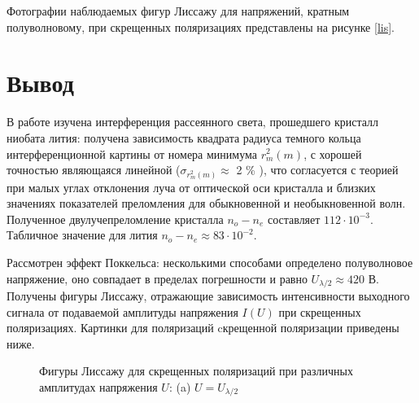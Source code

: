 	Фотографии наблюдаемых фигур Лиссажу для напряжений, кратным полуволновому, при скрещенных поляризациях представлены на рисунке \ref{lis}.
	
	\section{Вывод}
	
	В работе изучена интерференция рассеянного света, прошедшего кристалл ниобата лития: получена зависимость квадрата радиуса темного кольца интерференционной картины от номера минимума $r_m^2(m)$, с хорошей точностью являющаяся линейной ($\sigma_{r_m^2(m)} \approx $ 2 \% ), что согласуется с теорией при малых углах отклонения луча от оптической оси кристалла и близких значениях показателей преломления для обыкновенной и необыкновенной волн. Полученное двулучепреломление кристалла $n_o - n_e$ составляет $112 \cdot 10^{-3} $. Табличное значение для лития $n_o - n_e \approx 83 \cdot 10^{-2}$. 
	
	Рассмотрен эффект Поккельса: несколькими способами определено полуволновое напряжение, оно совпадает в пределах погрешности и равно $U_{\lambda/2} \approx 420$ В. Получены фигуры Лиссажу, отражающие зависимость интенсивности выходного сигнала от подаваемой амплитуды напряжения $I(U)$ при скрещенных поляризациях. Картинки для поляризаций cкрещенной поляризации приведены ниже.
	
	
    	\begin{figure}
    	    \caption{Фигуры Лиссажу для скрещенных поляризаций при различных амплитудах напряжения $U$: (a) $U = U_{\lambda/2}$}
    	    \label{pic2}
    	\end{figure}
	
